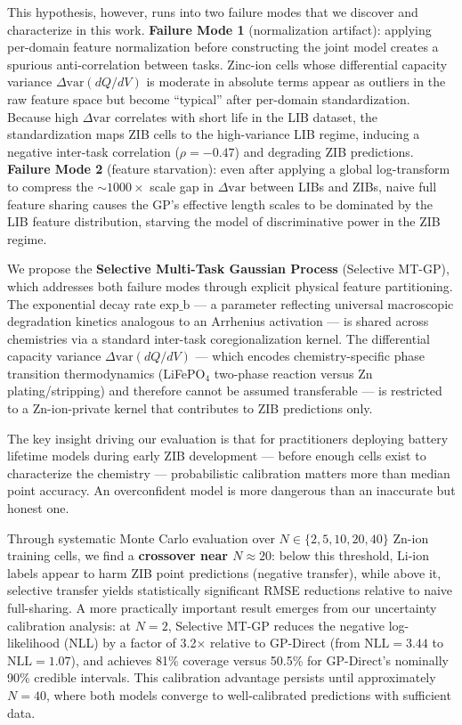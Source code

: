 \documentclass[12pt]{article}
\begin{document}
This hypothesis, however, runs into two failure modes that we discover and
characterize in this work. \textbf{Failure Mode 1} (normalization
artifact): applying per-domain feature normalization before constructing the
joint model creates a spurious anti-correlation between tasks. Zinc-ion cells
whose differential capacity variance $\Delta\mathrm{var}(dQ/dV)$ is moderate
in absolute terms appear as outliers in the raw feature space but become
``typical'' after per-domain standardization. Because high $\Delta\mathrm{var}$
correlates with short life in the LIB dataset, the standardization maps ZIB
cells to the high-variance LIB regime, inducing a negative inter-task
correlation ($\rho = -0.47$) and degrading ZIB predictions. \textbf{Failure
Mode 2} (feature starvation): even after applying a global log-transform to
compress the ${\sim}1000{\times}$ scale gap in $\Delta\mathrm{var}$ between
LIBs and ZIBs, naive full feature sharing causes the GP's effective length
scales to be dominated by the LIB feature distribution, starving the model of
discriminative power in the ZIB regime.

We propose the \textbf{Selective Multi-Task Gaussian Process}
(Selective MT-GP), which addresses both failure modes through explicit physical
feature partitioning. The exponential decay rate $\text{exp\_b}$ --- a
parameter reflecting universal macroscopic degradation kinetics analogous to an
Arrhenius activation --- is shared across chemistries via a standard inter-task
coregionalization kernel. The differential capacity variance
$\Delta\mathrm{var}(dQ/dV)$ --- which encodes chemistry-specific phase
transition thermodynamics (LiFePO$_4$ two-phase reaction versus Zn
plating/stripping) and therefore cannot be assumed transferable --- is
restricted to a Zn-ion-private kernel that contributes to ZIB predictions only.

The key insight driving our evaluation is that for practitioners deploying
battery lifetime models during early ZIB development --- before enough cells
exist to characterize the chemistry --- probabilistic calibration matters more
than median point accuracy. An overconfident model is more dangerous than an
inaccurate but honest one.

Through systematic Monte Carlo evaluation over $N \in \{2, 5, 10, 20, 40\}$
Zn-ion training cells, we find a \textbf{crossover near
$N \approx 20$}: below this threshold, Li-ion labels appear to harm ZIB point
predictions (negative transfer), while above it, selective transfer yields
statistically significant RMSE reductions relative to naive full-sharing.
A more practically important result emerges from our uncertainty
calibration analysis: at $N = 2$, Selective MT-GP reduces the negative
log-likelihood (NLL) by a factor of 3.2$\times$ relative to GP-Direct (from
$\mathrm{NLL} = 3.44$ to $\mathrm{NLL} = 1.07$), and achieves 81\% coverage
versus 50.5\% for GP-Direct's nominally 90\% credible intervals. This
calibration advantage persists until approximately $N = 40$, where both models
converge to well-calibrated predictions with sufficient data.
\end{document}
